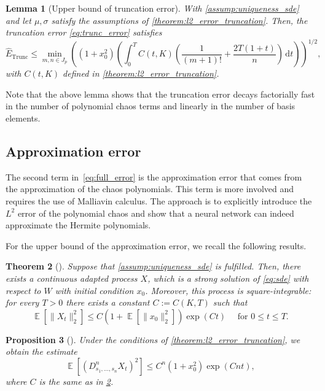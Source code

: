 \documentclass[12pt]{article}
\newtheorem{theorem}{Theorem}[section]
\newtheorem{proposition}[theorem]{Proposition}
\newtheorem{lemma}[theorem]{Lemma}
\theoremstyle{remark}
\theoremstyle{plain}
\numberwithin{equation}{section}
\newcommand{\dd}{\ensuremath{\,\mathrm d}}
\DeclareMathOperator{\E}{\mathbb E}
\begin{document}
\begin{lemma}[{Upper bound of truncation error}]\label{lemma:ub_trunc_error}
    With \cref{assump:uniqueness_sde} and let $\mu,\sigma$ satisfy the assumptions of \cref{theorem:l2_error_truncation}. 
    Then, the \emph{truncation error} \cref{eq:trunc_error} satisfies
    \begin{equation}
        \hat E_\text{Trunc} \leq \min_{m,n \in J_p}\left( (1+x_0^2)\left(\int_0^T C(t, K)\left(\frac{1}{(m+1)!} + \frac{2T(1+t)}{n}\right) \dd t\right)\right)^{1/2}, %
    \end{equation}
    with $C(t,K)$ defined in \cref{theorem:l2_error_truncation}.
\end{lemma}

Note that the above lemma shows that the truncation error decays factorially fast in the number of polynomial chaos terms and linearly in the number of basis elements.

\subsection{Approximation error}
\label{sec:approximation error}
The second term in~\cref{eq:full_error} is the approximation error that comes from the approximation of the chaos polynomials.
This term is more involved and requires the use of Malliavin calculus.%
The approach is to explicitly introduce the $L^2$ error of the polynomial chaos and show that a neural network can indeed approximate the Hermite polynomials.

For the upper bound of the approximation error, we recall the following results.

\begin{theorem}[{\cite[Theorem~2.9, p. 289]{Karatzas1998}}]\label{theorem:square_int_process}
    Suppose that \cref{assump:uniqueness_sde} is fulfilled. Then, there exists a continuous adapted process $X$, which is a strong solution of \cref{eq:sde} with respect to $W$ with initial condition $x_0$. Moreover, this process is square-integrable: for every $T > 0$ there exists a constant $C := C(K,T)$ such that
    \begin{equation*}
        \E[\|X_t\|_2^2] \leq C(1+\E[\|x_0\|_2^2])\exp(Ct)\quad\text{ for } 0 \leq t \leq T.
    \end{equation*}
\end{theorem}

\begin{proposition}[{\cite[Proposition~4.1]{huschtoAsymptoticErrorChaos2019}}]\label{proposition:malliavin_bound}
    Under the conditions of \cref{theorem:l2_error_truncation}, we obtain the estimate
    \begin{equation*}
        \E[(D_{s_1,\dots,s_n}^n X_t)^2] \leq C^n (1+x_0^2)\exp(Cnt),
    \end{equation*}
    where $C$ is the same as in \cref{theorem:square_int_process}.
\end{proposition}
\end{document}
